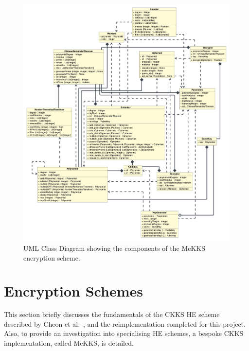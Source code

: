 \begin{figure}[h!]
    \centering
    \includegraphics[scale=0.2]{figures/mekksClasses}
    \captionsetup{justification=centering}
    \caption[MeKKS UML Class Diagram]{UML Class Diagram showing the components of the MeKKS encryption scheme.}
    \label{fig:mekksUML}
\end{figure}






\section{Encryption Schemes}
\indent \indent
This section briefly discusses the fundamentals of the CKKS HE scheme described by Cheon et al.\ \cite{CKKS}, and the reimplementation completed for this project. Also, to provide an investigation into specialising HE schemes, a bespoke CKKS implementation, called MeKKS, is detailed.
